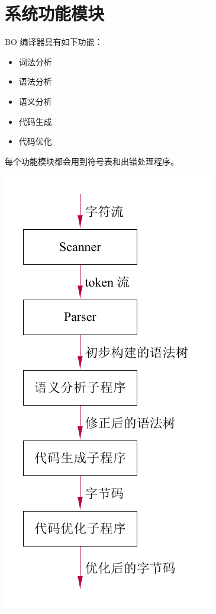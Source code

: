 \documentclass[dvipsnames, svgnames, x11names]{beamer}
\begin{document}
\section{系统功能模块}
\begin{frame}
    \begin{minipage}{.5\linewidth}
    \onslide<+-> BO 编译器具有如下功能：
    \begin{itemize}[<+->]
        \item 词法分析
        \item 语法分析
        \item 语义分析
        \item 代码生成
        \item 代码优化
    \end{itemize}
    \onslide<+-> 每个功能模块都会用到符号表和出错处理程序。
    \end{minipage}
    \quad\quad
    \begin{minipage}{.4\linewidth}
    \includegraphics[height=\textheight]{../figure/compileProcess(2).pdf}
    \end{minipage}
\end{frame}
% 
\end{document}
